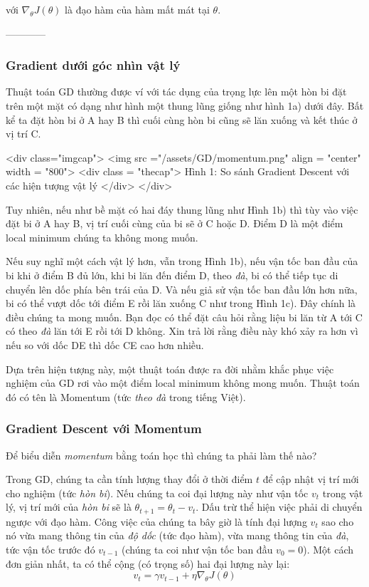  
với $\nabla_{\theta}J(\theta)$ là đạo hàm của hàm mất mát tại $\theta$. 
 
------------ 
 
 
\subsubsection{Gradient dưới góc nhìn vật lý }
 
Thuật toán GD thường được ví với tác dụng của trọng lực lên một hòn bi đặt trên một mặt có dạng như hình một thung lũng giống như hình 1a) dưới đây. Bất kể ta đặt hòn bi ở A hay B thì cuối cùng hòn bi cũng sẽ lăn xuống và kết thúc ở vị trí C. 
 
<div class="imgcap"> 
 <img src ="/assets/GD/momentum.png" align = "center" width = "800"> 
 <div class = "thecap"> Hình 1: So sánh Gradient Descent với các hiện tượng vật lý </div> 
</div> 
 
Tuy nhiên, nếu như bề mặt có hai đáy thung lũng như Hình 1b) thì tùy vào việc đặt bi ở A hay B, vị trí cuối cùng của bi sẽ ở C hoặc D. Điểm D là một điểm local minimum chúng ta không mong muốn.  
 
Nếu suy nghĩ một cách vật lý hơn, vẫn trong Hình 1b), nếu vận tốc ban đầu của bi khi ở điểm B đủ lớn, khi bi lăn đến điểm D, theo \textit{đà}, bi có thể tiếp tục di chuyển lên dốc phía bên trái của D. Và nếu giả sử vận tốc ban đầu lớn hơn nữa, bi có thể vượt dốc tới điểm E rồi lăn xuống C như trong Hình 1c). Đây chính là điều chúng ta mong muốn. Bạn đọc có thể đặt câu hỏi rằng liệu bi lăn từ A tới C có theo \textit{đà} lăn tới E rồi tới D không. Xin trả lời rằng điều này khó xảy ra hơn vì nếu so với dốc DE thì dốc CE cao hơn nhiều. 
 
Dựa trên hiện tượng này, một thuật toán được ra đời nhằm khắc phục việc nghiệm của GD rơi vào một điểm local minimum không mong muốn. Thuật toán đó có tên là Momentum (tức \textit{theo đà} trong tiếng Việt). 
 
 
\subsubsection{Gradient Descent với Momentum}
Để biểu diễn \textit{momentum} bằng toán học thì chúng ta phải làm thế nào? 
 
Trong GD, chúng ta cần tính lượng thay đổi ở thời điểm $t$ để cập nhật vị trí mới cho nghiệm (tức \textit{hòn bi}). Nếu chúng ta coi đại lượng này như vận tốc $v_t$ trong vật lý, vị trí mới của \textit{hòn bi} sẽ là $\theta_{t+1} = \theta_{t} - v_t$. Dấu trừ thể hiện việc phải di chuyển ngược với đạo hàm. Công việc của chúng ta bây giờ là tính đại lượng $v_t$ sao cho nó vừa mang thông tin của \textit{độ dốc} (tức đạo hàm), vừa mang thông tin của \textit{đà}, tức vận tốc trước đó $v_{t-1}$ (chúng ta coi như vận tốc ban đầu $v_0=0$). Một cách đơn giản nhất, ta có thể cộng (có trọng số) hai đại lượng này lại: 
\begin{equation*} 
v_{t}= \gamma v_{t-1} + \eta \nabla_{\theta}J(\theta) 
\end{equation*} 
 
